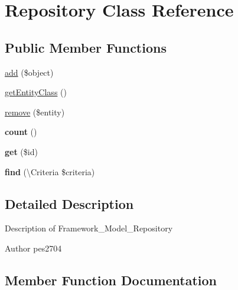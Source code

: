 \hypertarget{class_framework_1_1_model_1_1_repository}{}\section{Repository Class Reference}
\label{class_framework_1_1_model_1_1_repository}
\subsection*{Public Member Functions}
\begin{DoxyCompactItemize}
\item 
\mbox{\hyperlink{class_framework_1_1_model_1_1_repository_a28c225013feb765170e788e9f060b54f}{add}} (\$object)
\item 
\mbox{\hyperlink{class_framework_1_1_model_1_1_repository_a82bf7d9129d40bb5d953f2b08210fccc}{get\+Entity\+Class}} ()
\item 
\mbox{\hyperlink{class_framework_1_1_model_1_1_repository_a9ba1bf42939522398e98e21b528ad72b}{remove}} (\$entity)
\item 
\mbox{\label{class_framework_1_1_model_1_1_repository_ac751e87b3d4c4bf2feb03bee8b092755}} 
{\bfseries count} ()
\item 
\mbox{\label{class_framework_1_1_model_1_1_repository_a50e3bfb586b2f42932a6a93f3fbb0828}} 
{\bfseries get} (\$id)
\item 
\mbox{\label{class_framework_1_1_model_1_1_repository_aae9ef117e79df08b88e7e908fe147f5b}} 
{\bfseries find} (\textbackslash{}Criteria \$criteria)
\end{DoxyCompactItemize}


\subsection{Detailed Description}
Description of Framework\+\_\+\+Model\+\_\+\+Repository \begin{DoxyAuthor}{Author}
pes2704 
\end{DoxyAuthor}


\subsection{Member Function Documentation}
\mbox{\label{class_framework_1_1_model_1_1_repository_a28c225013feb765170e788e9f060b54f}} 
